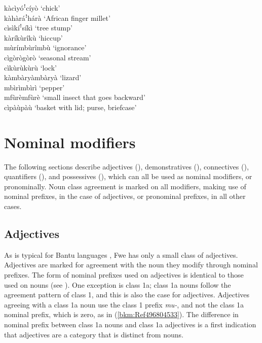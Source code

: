 \ea
\label{bkm:Ref99546467}
kàcìyóꜝcíyò \tab ‘chick’\\
kàhàráꜝhárà \tab ‘African finger millet’\\
cìsìkíꜝsíkì \tab ‘tree stump’\\
kàríkùrîkù \tab ‘hiccup’\\
mùrímbùrîmbù \tab ‘ignorance’\\
cìgòrògòrò \tab ‘seasonal stream’\\
cìkùrùkùrù \tab ‘lock’\\
kàmbàryàmbàryà \tab ‘lizard’\\
mbìrìmbìrì \tab ‘pepper’\\
mfùrèmfùrè \tab ‘small insect that goes backward’\\
cìpàùpàù \tab ‘basket with lid; purse, briefcase’\\
\z

\section{Nominal modifiers}
\label{bkm:Ref74305906}\hypertarget{Toc75352645}{}
The following sections describe adjectives (), demonstratives (), connectives (), quantifiers (), and possessives (), which can all be used as nominal modifiers, or pronominally. Noun class agreement is marked on all modifiers, making use of nominal prefixes, in the case of adjectives, or pronominal prefixes, in all other cases.

\subsection{Adjectives}
\label{bkm:Ref491277755}\hypertarget{Toc75352646}{}
As is typical for Bantu languages \citep[105]{Maho1999}, Fwe has only a small class of adjectives. Adjectives are marked for agreement with the noun they modify through nominal prefixes. The form of nominal prefixes used on adjectives is identical to those used on nouns (see ). One exception is class 1a; class 1a nouns follow the agreement pattern of class 1, and this is also the case for adjectives. Adjectives agreeing with a class 1a noun use the class 1 prefix \textit{mu-}, and not the class 1a nominal prefix, which is zero, as in (\ref{bkm:Ref496804533}). The difference in nominal prefix between class 1a nouns and class 1a adjectives is a first indication that adjectives are a category that is distinct from nouns.

